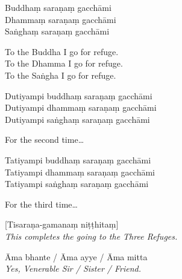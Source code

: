 Buddhaṃ saraṇaṃ gacchāmi\\
Dhammaṃ saraṇaṃ gacchāmi\\
Saṅghaṃ saraṇaṃ gacchāmi

\begin{english}
  To the Buddha I go for refuge.\\
  To the Dhamma I go for refuge.\\
  To the Saṅgha I go for refuge.
\end{english}

Dutiyampi buddhaṃ saraṇaṃ gacchāmi\\
Dutiyampi dhammaṃ saraṇaṃ gacchāmi\\
Dutiyampi saṅghaṃ saraṇaṃ gacchāmi

\begin{english}
  For the second time\ldots
\end{english}

Tatiyampi buddhaṃ saraṇaṃ gacchāmi\\
Tatiyampi dhammaṃ saraṇaṃ gacchāmi\\
Tatiyampi saṅghaṃ saraṇaṃ gacchāmi

\begin{english}
  For the third time\ldots
\end{english}


[Tisaraṇa-gamanaṃ niṭṭhitaṃ]\\
\emph{This completes the going to the Three Refuges.}


Āma bhante / Āma ayye / Āma mitta\\
\emph{Yes, Venerable Sir / Sister / Friend.}

\enlargethispage{-\baselineskip}


